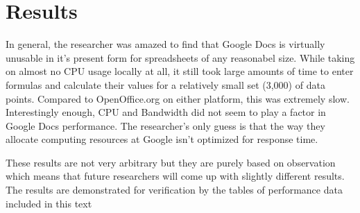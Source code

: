 \section{Results}

In general, the researcher was amazed to find that Google Docs is virtually
unusable in it's present form for spreadsheets of any reasonabel size.  While
taking on almost no CPU usage locally at all, it still took large amounts of
time to enter formulas and calculate their values for a relatively small set
(3,000) of data points.  Compared to OpenOffice.org on either platform, this was
extremely slow.  Interestingly enough, CPU and Bandwidth did not seem to play a
factor in Google Docs performance.  The researcher's only guess is that the way
they allocate computing resources at Google isn't optimized for response time.

These results are not very arbitrary but they are purely based on observation
which means that future researchers will come up with slightly different
results.  The results are demonstrated for verification by the tables of
performance data included in this text
